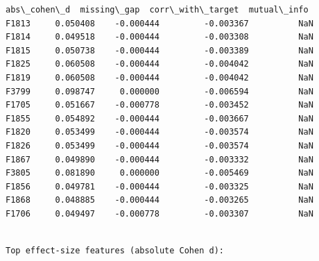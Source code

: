 \documentclass[11pt]{article}
\begin{document}
\begin{Verbatim}[commandchars=\\\{\}]
       abs\_cohen\_d  missing\_gap  corr\_with\_target  mutual\_info  
F1813     0.050408    -0.000444         -0.003367          NaN  
F1814     0.049518    -0.000444         -0.003308          NaN  
F1815     0.050738    -0.000444         -0.003389          NaN  
F1825     0.060508    -0.000444         -0.004042          NaN  
F1819     0.060508    -0.000444         -0.004042          NaN  
F3799     0.098747     0.000000         -0.006594          NaN  
F1705     0.051667    -0.000778         -0.003452          NaN  
F1855     0.054892    -0.000444         -0.003667          NaN  
F1820     0.053499    -0.000444         -0.003574          NaN  
F1826     0.053499    -0.000444         -0.003574          NaN  
F1867     0.049890    -0.000444         -0.003332          NaN  
F3805     0.081890     0.000000         -0.005469          NaN  
F1856     0.049781    -0.000444         -0.003325          NaN  
F1868     0.048885    -0.000444         -0.003265          NaN  
F1706     0.049497    -0.000778         -0.003307          NaN  
    \end{Verbatim}

    
    \begin{Verbatim}[commandchars=\\\{\}]

Top effect-size features (absolute Cohen d):
    \end{Verbatim}
\end{document}
